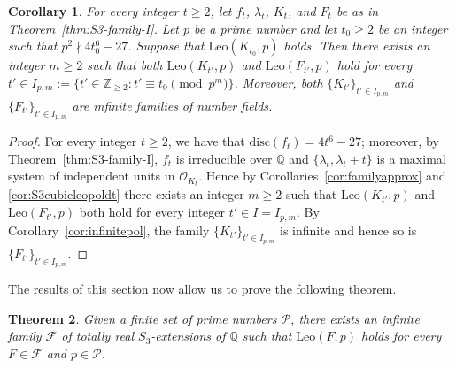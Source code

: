 \documentclass[12pt]{amsart}
\theoremstyle{plain}
\newtheorem{theorem}{Theorem}[section]
\newtheorem{corollary}[theorem]{Corollary}
\theoremstyle{remark}
\theoremstyle{definition}
\newcommand{\Z}{\mathbb{Z}}
\newcommand{\Q}{\mathbb{Q}}
\newcommand{\Leo}{\mathrm{Leo}}
\numberwithin{equation}{section}
\begin{document}
\begin{corollary}\label{cor:cubicfamily}
For every integer $t \geq 2$, let $f_{t}$, $\lambda_{t}$, $K_{t}$, and $F_{t}$ be as in Theorem~\ref{thm:S3-family-I}. 
Let $p$ be a prime number and let $t_{0} \geq 2$ be an integer such that $p^{2} \nmid 4t_{0}^6-27$. 
Suppose that $\Leo(K_{t_0},p)$ holds. 
Then there exists an integer $m \geq 2$ such that both $\Leo(K_{t'},p)$ and $\Leo(F_{t'},p)$
hold for every $t' \in I_{p,m} := \{ t' \in \Z_{\geq 2} : t'\equiv t_{0} \pmod{p^{m}} \}$. 
Moreover, both $\{K_{t'}\}_{t' \in I_{p,m}}$ and $\{F_{t'}\}_{t' \in I_{p,m}}$ are infinite families of number fields.
\end{corollary}

\begin{proof} 
For every integer $t \geq 2$, we have that  $\mathrm{disc}(f_{t})=4t^{6}-27$; moreover, 
by Theorem~\ref{thm:S3-family-I},  $f_{t}$ is irreducible over $\Q$ and
$\{ \lambda_{t}, \lambda_{t}+t \}$
is a maximal system of independent units in $\mathcal{O}_{K_{t}}$.
Hence by Corollaries~\ref{cor:familyapprox} and \ref{cor:S3cubicleopoldt} there exists an integer $m \geq 2$ such that 
$\Leo(K_{t'},p)$ and $\Leo(F_{t'},p)$ both hold for every integer $t' \in I=I_{p,m}$.
By Corollary~\ref{cor:infinitepol}, 
the family $\{K_{t'}\}_{t' \in I_{p,m}}$ is infinite and hence so is $\{F_{t'}\}_{t' \in I_{p,m}}$.
\end{proof}

The results of this section now allow us to prove the following theorem.

\begin{theorem}\label{thm:finalfamily}
Given a finite set of prime numbers $\mathcal{P}$,
there exists an infinite family $\mathcal{F}$ of totally real 
$S_{3}$-extensions of $\Q$ such that $\Leo(F,p)$ holds for every $F \in \mathcal{F}$ and $p\in\mathcal{P}$.
\end{theorem}
\end{document}
